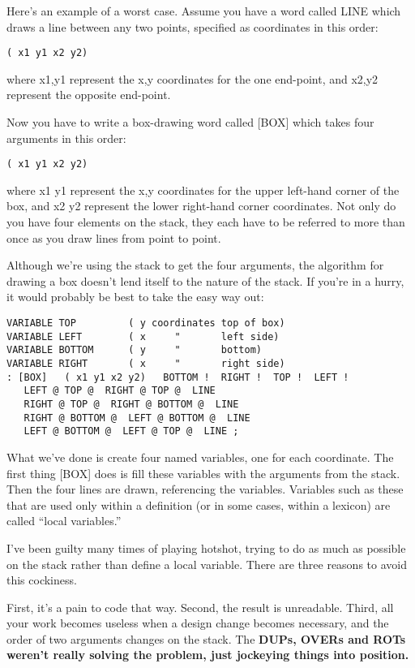 Here's an example of a worst case. Assume you have a word called
LINE which draws a line between any two points, specified as coordinates
in this order:

\begin{verbatim}
( x1 y1 x2 y2)
\end{verbatim}

where x1,y1 represent the x,y coordinates for the one end-point, and
x2,y2 represent the opposite end-point.

Now you have to write a box-drawing word called [BOX] which
takes four arguments in this order:

\begin{verbatim}
( x1 y1 x2 y2)
\end{verbatim}

where x1 y1 represent the x,y coordinates for the upper left-hand corner
of the box, and x2 y2 represent the lower right-hand corner coordinates.
Not only do you have four elements on the stack, they each have to
be referred to more than once as you draw lines from point to point.

Although we're using the stack to get the four arguments, the algorithm
for drawing a box doesn't lend itself to the nature of the stack. If you're
in a hurry, it would probably be best to take the easy way out:

\begin{verbatim}
VARIABLE TOP         ( y coordinates top of box)
VARIABLE LEFT        ( x     "       left side)
VARIABLE BOTTOM      ( y     "       bottom)
VARIABLE RIGHT       ( x     "       right side)
: [BOX]   ( x1 y1 x2 y2)   BOTTOM !  RIGHT !  TOP !  LEFT !
   LEFT @ TOP @  RIGHT @ TOP @  LINE
   RIGHT @ TOP @  RIGHT @ BOTTOM @  LINE
   RIGHT @ BOTTOM @  LEFT @ BOTTOM @  LINE
   LEFT @ BOTTOM @  LEFT @ TOP @  LINE ;
\end{verbatim}

What we've done is create four named variables, one for each coordinate.
The first thing [BOX] does is fill these variables with the arguments from
the stack. Then the four lines are drawn, referencing the variables.
Variables such as these that are used only within a definition (or in some
cases, within a lexicon) are called ``local variables.''

I've been guilty many times of playing hotshot, trying to do as
much as possible on the stack rather than define a local variable. There
are three reasons to avoid this cockiness.

First, it's a pain to code that way. Second, the result is unreadable.
Third, all your work becomes useless when a design change becomes
necessary, and the order of two arguments changes on the stack. The
\bf{DUP}s, \bf{OVER}s and \bf{ROT}s weren't really solving the problem,
just jockeying things into position.

